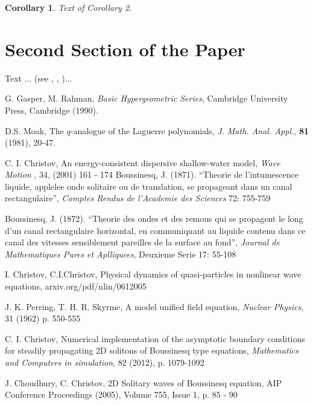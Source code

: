 \documentclass[12pt]{article}
\theoremstyle{theorem}
\newtheorem{corollary}[theorem]{Corollary}
\theoremstyle{defi}
\begin{document}
\begin{corollary}
Text of Corollary 2.
\end{corollary}

\section{Second Section of the Paper}

Text ... (see \cite{gasrah}, \cite{rosbl}, \cite{Moak})...

\begin{thebibliography}{99}

 G. Gasper, M. Rahman,
{\it Basic Hypergeometric Series}, Cambridge University Press, Cambridge (1990).

 D.S. Moak,
The $q$-analogue of the Laguerre polynomials, {\it J. Math. Anal. Appl.}, {\bf 81} (1981), 20-47.

 C. I. Christov, An energy-consistent dispersive shallow-water model,  {\it Wave Motion }, 34, (2001) 161 - 174
 Boussinesq, J. (1871). “Theorie de l’intumescence liquide, applelee onde solitaire ou de translation, se propageant dans un canal rectangulaire”,  {\it Comptes Rendus de l’Academie des Sciences } 72: 755-759

 Boussinesq, J. (1872). “Theorie des ondes et des remous qui se propagent le long d’un canal rectangulaire horizontal, en communiquant au liquide contenu dans ce canal des vitesses sensiblement pareilles de la surface au fond”, {\it Journal de Mathematiques Pures et Aplliquees}, Deuxieme Serie 17: 55-108

 I. Christov, C.I.Christov, Physical dynamics of quasi-particles in nonlinear wave equations, arxiv.org/pdf/nlin/0612005

 J. K. Perring, T. H. R. Skyrme, A model unified field equation, {\it Nuclear Physics},  31 (1962) p. 550-555 

  C. I. Christov, Numerical implementation of the asymptotic boundary conditions for steadily propagating 2D solitons of Boussinesq type equations, {\it Mathematics and Computers in simulation}, 82 (2012), p. 1079-1092

  J. Choudhury, C. Christov, 2D Solitary waves of Boussinesq equation, AIP Conference Proceedings (2005), Volume 755, Issue 1, p. 85 - 90


\end{thebibliography}
\end{document}
